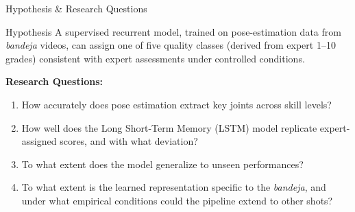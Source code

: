 \begin{frame}{Hypothesis \& Research Questions}
\hypertarget{sub:research}{}%
\begin{block}{Hypothesis}
\small A supervised \alert{recurrent model}, trained on pose-estimation data from \emph{bandeja} videos, can assign \alert{one of five quality classes} (derived from expert 1--10 grades) \alert{consistent with expert assessments} under controlled conditions.
\end{block}
\vspace{4pt}
\textbf{\color{tecdark}Research Questions:}
\begin{enumerate}\small
    \item How accurately does pose estimation extract key joints across skill levels?
    \item How well does the Long Short-Term Memory (LSTM) model replicate expert-assigned scores, and with what deviation?
    \item To what extent does the model generalize to unseen performances?
    \item To what extent is the learned representation specific to the \emph{bandeja}, and under what empirical conditions could the pipeline extend to other shots?
\end{enumerate}
\end{frame}

